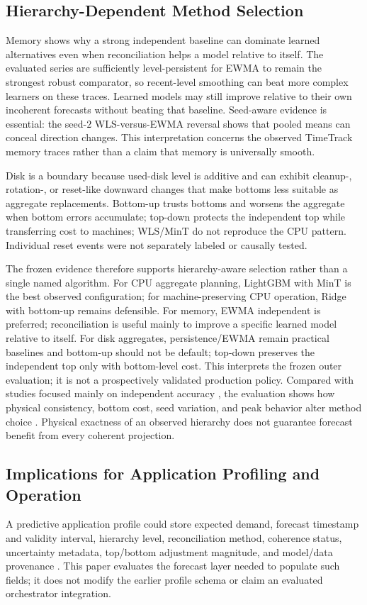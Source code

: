\documentclass[a4paper,fleqn]{cas-dc}
\begin{document}
\subsection{Hierarchy-Dependent Method Selection}
\label{sec:disc-select}
Memory shows why a strong independent baseline can dominate learned alternatives
even when reconciliation helps a model relative to itself.
The evaluated series are sufficiently level-persistent for {EWMA} to remain the
strongest robust comparator, so recent-level smoothing can beat more complex
learners on these traces.
Learned models may still improve relative to their own incoherent forecasts
without beating that baseline.
Seed-aware evidence is essential: the seed-$2$ {WLS}-versus-{EWMA} reversal
shows that pooled means can conceal direction changes.
This interpretation concerns the observed TimeTrack memory traces rather than a
claim that memory is universally smooth.

Disk is a boundary because used-disk level is additive and can exhibit
cleanup-, rotation-, or reset-like downward changes that make bottoms less
suitable as aggregate replacements.
Bottom-up trusts bottoms and worsens the aggregate when bottom errors accumulate;
top-down protects the independent top while transferring cost to machines;
{WLS}/MinT do not reproduce the {CPU} pattern.
Individual reset events were not separately labeled or causally tested.

The frozen evidence therefore supports hierarchy-aware selection rather than a
single named algorithm.
For {CPU} aggregate planning, LightGBM with MinT is the best observed
configuration; for machine-preserving {CPU} operation, Ridge with bottom-up
remains defensible.
For memory, {EWMA} independent is preferred; reconciliation is useful mainly to
improve a specific learned model relative to itself.
For disk aggregates, persistence/{EWMA} remain practical baselines and bottom-up
should not be default; top-down preserves the independent top only with
bottom-level cost.
This interprets the frozen outer evaluation; it is not a prospectively validated
production policy.
Compared with studies focused mainly on independent accuracy
\cite{masdari2020workload,hyndman2021forecasting}, the evaluation shows how
physical consistency, bottom cost, seed variation, and peak behavior alter method
choice \cite{athanasopoulos2024hierarchical}.
Physical exactness of an observed hierarchy does not guarantee forecast benefit
from every coherent projection.

\subsection{Implications for Application Profiling and Operation}
\label{sec:disc-ops}
A predictive application profile could store expected demand, forecast timestamp
and validity interval, hierarchy level, reconciliation method, coherence status,
uncertainty metadata, top/bottom adjustment magnitude, and model/data provenance
\cite{kadouma2025unifiedprofile}.
This paper evaluates the forecast layer needed to populate such fields; it does
not modify the earlier profile schema or claim an evaluated orchestrator
integration.
\end{document}
